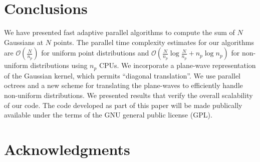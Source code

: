 \documentclass[conference]{IEEEtran}
\begin{document}
\section{Conclusions}
\label{sc:conclusions}
We have presented fast adaptive parallel algorithms to compute the sum of $N$ Gaussians at $N$ points. The parallel time complexity estimates for our algorithms are $ \mathcal{O} \left(\frac{N}{n_p} \right)$ for uniform point distributions and $ \mathcal{O} \left(\frac{N}{n_p}\log \frac{N}{n_p} + n_p \log n_p\right)$ for non-uniform distributions using $n_p$ CPUs. We incorporate a plane-wave representation of the Gaussian kernel, which permits ``diagonal translation''. We use parallel octrees and a new scheme for translating the plane-waves to efficiently handle non-uniform distributions. We presented results that verify the overall scalability of our code. The code developed as part of this paper will be made publically available under the terms of the GNU general public license (GPL). 




\section*{Acknowledgments}




\end{document}
